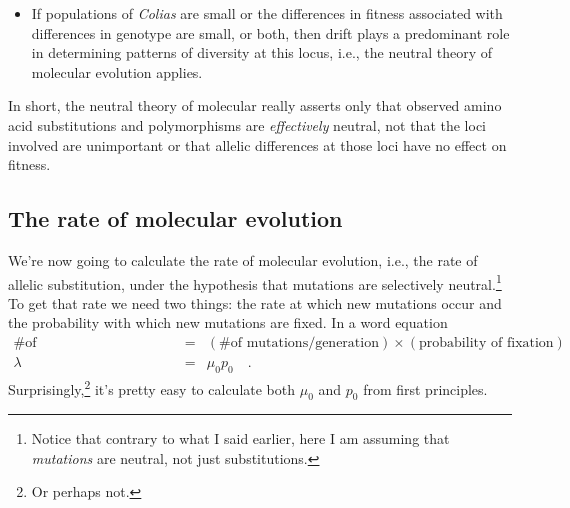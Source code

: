 \begin{itemize}
\begin{itemize}
\item If populations of {\it Colias\/} are small or the differences in
  fitness associated with differences in genotype are small, or both,
  then drift plays a predominant role in determining patterns of
  diversity at this locus, i.e., the neutral theory of molecular
  evolution applies.

\end{itemize}

\end{itemize}

\noindent In short, the neutral theory of molecular really asserts
only that observed amino acid substitutions and polymorphisms are {\it
effectively\/} neutral, not that the loci involved are unimportant or
that allelic differences at those loci have no effect on
fitness.

\subsection*{The rate of molecular evolution}

We're now going to calculate the rate of molecular evolution, i.e.,
the rate of allelic substitution, under the hypothesis that mutations
are selectively neutral.\footnote{Notice that contrary to what I said
  earlier, here I am assuming that {\it mutations\/} are neutral, not
  just substitutions.} To get that rate we need two things: the rate
at which new mutations occur and the probability with which new
mutations are fixed. In a word equation
\begin{eqnarray*}
\mbox{\# of substitutions/generation} &=& (\mbox{\# of mutations/generation})\times(\mbox{probability
  of fixation}) \\
\lambda &=& \mu_0p_0 \quad .
\end{eqnarray*}
Surprisingly,\footnote{Or perhaps not.} it's pretty easy to calculate
both $\mu_0$ and $p_0$ from first principles.

